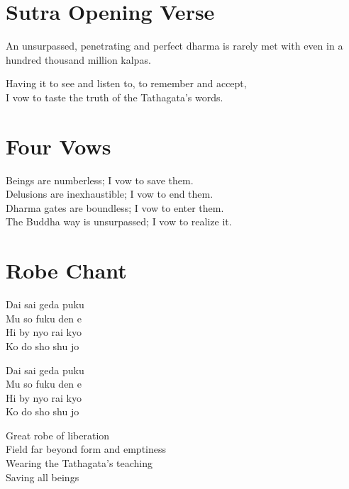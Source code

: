 \documentclass{chant-card}
\begin{document}
\fontsize{12pt}{14pt}\selectfont

\section{Sutra Opening Verse}
\begin{center}
An unsurpassed, penetrating and perfect dharma is rarely met with even in a
hundred thousand million kalpas.

Having it to see and listen to, to remember and accept,\\
I vow to taste the truth of the Tathagata's words.
\end{center}

\section{Four Vows}
\begin{center}
Beings are numberless; I vow to save them.\\
Delusions are inexhaustible; I vow to end them.\\
Dharma gates are boundless; I vow to enter them.\\
The Buddha way is unsurpassed; I vow to realize it.
\end{center}

\newpage

\section{Robe Chant}
\def\robechant{%
\begin{center}
Dai sai geda puku\\
Mu so fuku den e\\
Hi by nyo rai kyo\\
Ko do sho shu jo
\end{center}}
\parbox[b]{.5\textwidth}{\robechant}
\parbox[b]{.5\textwidth}{\robechant}
\begin{center}
  Great robe of liberation\\
  Field far beyond form and emptiness\\
  Wearing the Tathagata's teaching\\
  Saving all beings
\end{center}
\end{document}
